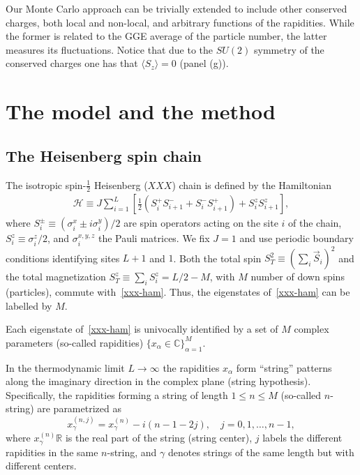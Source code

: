 \documentclass[twocolumn,superscriptaddress,prb,10pt]{revtex4-1}
\begin{document}
Our Monte Carlo approach can be trivially extended to include other conserved 
charges, both local and non-local, and arbitrary functions of the rapidities. 
While the former is related to the GGE average of the particle number, the 
latter measures its fluctuations. Notice that due to the $SU(2)$ symmetry 
of the conserved charges one has that $\langle S_z\rangle=0$ (panel (g)). 




\section{The model and the method}


\subsection{The Heisenberg spin chain}

The isotropic spin-$\frac{1}{2}$ Heisenberg ($XXX$) chain is defined by the 
Hamiltonian 
%
\begin{align}
\label{xxx-ham}
{\mathcal H}\equiv J\sum\limits_{i=1}^L\left[\frac{1}{2}(S_i^+S^-_{i+1} 
+S_i^{-}S_{i+1}^+)+S_i^zS_{i+1}^z\right],  
\end{align}
%
where $S^{\pm}_i\equiv (\sigma_i^x\pm i\sigma_i^y)/2$ are spin operators 
acting on the site $i$ of the chain, $S_i^z\equiv\sigma_i^z/2$, and 
$\sigma^{x,y,z}_i$ the Pauli matrices. We fix $J=1$ and use periodic 
boundary conditions identifying sites $L+1$ and $1$. Both the total spin 
$S_T^2\equiv(\sum_i \vec S_i)^2$ and the total magnetization $S_{T}^z\equiv
\sum_iS_i^z=L/2-M$, with $M$ number of down spins (particles), commute 
with~\eqref{xxx-ham}. Thus, the eigenstates of~\eqref{xxx-ham} can be 
labelled by $M$. 

Each eigenstate of~\eqref{xxx-ham} is univocally identified by a set of $M$ 
complex parameters (so-called rapidities) $\{x_\alpha\in\mathbb{C}
\}_{\alpha=1}^M$. 

In the 
thermodynamic limit $L\to\infty$ the rapidities ${x_\alpha}$ form 
``string'' patterns along the imaginary direction in the complex plane 
(string hypothesis). Specifically, the rapidities forming a string of 
length $1\le n\le M$ (so-called $n$-string) are parametrized as 
%
\begin{equation}
x_\gamma^{(n,j)}=x_\gamma^{(n)}-i(n-1-2j),\quad j=0,1,\dots,n-1,
\label{string-hyp}
\end{equation}
% 
where $x_\gamma^{(n)}\mathbb{R}$ is the real part of the string (string 
center), $j$ labels the different rapidities in the same $n$-string, and
$\gamma$ denotes strings of the same length but with different centers.
\end{document}
